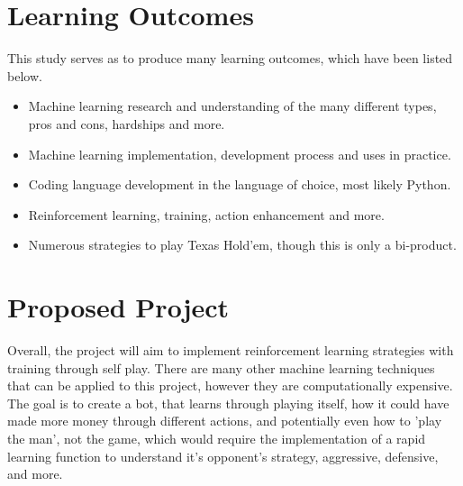 \documentclass[12pt]{article}
\begin{document}
\section{Learning Outcomes}
This study serves as to produce many learning outcomes, which have been listed below.
\begin{itemize}
	\item Machine learning research and understanding of the many different types, pros and cons, hardships and more.
	\item Machine learning implementation, development process and uses in practice.
	\item Coding language development in the language of choice, most likely Python.
	\item Reinforcement learning, training, action enhancement and more.
	\item Numerous strategies to play Texas Hold'em, though this is only a bi-product.
\end{itemize}

\section{Proposed Project}
Overall, the project will aim to implement reinforcement learning strategies with training through self play. There are many other machine learning techniques that can be applied to this project, however they are computationally expensive. The goal is to create a bot, that learns through playing itself, how it could have made more money through different actions, and potentially even how to 'play the man', not the game, which would require the implementation of a rapid learning function to understand it's opponent's strategy, aggressive, defensive, and more.
\end{document}
